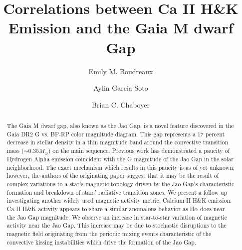 \documentclass[twocolumn]{aastex62}
\begin{document}
\title{Correlations between Ca II H\&K Emission and the Gaia M dwarf Gap}


\author[0000-0002-2600-7513]{Emily M. Boudreaux}

\author[0000-0001-9828-3229]{Aylin Garcia Soto}

\author[0000-0003-3096-4161]{Brian C. Chaboyer}

\received{}
\revised{}
\revised{}
\accepted{}


\begin{abstract}
  The Gaia M dwarf gap, also known as the Jao Gap, is a novel feature
  discovered in the Gaia DR2 G vs. BP-RP color magnitude diagram. This gap
  represents a 17 percent decrease in stellar density in a thin magnitude band around the
  convective transition mass ($\sim 0.35 M_{\odot}$) on the main sequence.
  Previous work has demonstrated a paucity of Hydrogen
  Alpha emission coincident with the G magnitude of the Jao Gap in the solar
  neighborhood. The exact mechanism which results in this paucity is as of yet
  unknown; however, the authors of the originating paper suggest that it may
  be the result of complex variations to a star's magnetic topology driven by
  the Jao Gap's characteristic formation and breakdown of stars' radiative
  transition zones. We present a follow up investigating another widely used
  magnetic activity metric, Calcium II H\&K emission. Ca II H\&K activity
  appears to share a similar anomalous behavior as H$\alpha$ does near the Jao
  Gap magnitude. We observe an increase in star-to-star variation of magnetic
  activity near the Jao Gap. This increase may be due to stochastic disruptions
  to the magnetic field originating from the periodic mixing events
  characteristic of the convective kissing instabilities which drive the
  formation of the Jao Gap.

\end{abstract}



\end{document}
